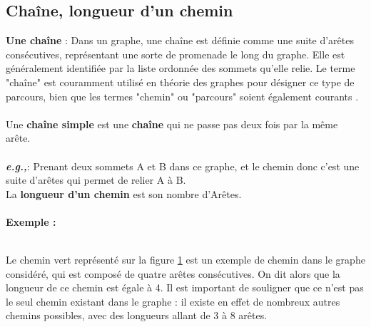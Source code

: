 \documentclass[hidelinks,letterpaper,12pt]{article}
\newcounter{Exemple} %
\begin{document}
\subsection{Chaîne, longueur d’un chemin}
\label{Chaîne, longeur d’un chemin}    
\textbf{Une chaîne} : Dans un graphe, une chaîne est définie comme une suite d'arêtes consécutives, représentant une sorte de promenade le long du graphe. Elle est généralement identifiée par la liste ordonnée des sommets qu'elle relie. Le terme "chaîne" est couramment utilisé en théorie des graphes pour désigner ce type de parcours, bien que les termes "chemin" ou "parcours" soient également courants \citep{mehl}.	
\\ \\
Une \textbf{chaîne simple} est une \textbf{chaîne} qui ne passe pas deux fois par la même arête.
\\ \\
\textbf{\textit{e.g.,}}: Prenant deux sommets A et B dans ce graphe, et le chemin donc c'est une suite d'arêtes qui permet de relier A à B.
\\
La \textbf{longueur d’un chemin} est son nombre d’Arêtes.
\\ \\ 
\textbf{Exemple :}
\begin{figure}[ht]
\centering			
{}
\label{Exemple 1 d'un chemin de longueur 4}	
\end{figure}	
\\
Le chemin vert représenté sur la figure \ref{Exemple 1 d'un chemin de longueur 4} est un exemple de chemin dans le graphe considéré, qui est composé de quatre arêtes consécutives. On dit alors que la longueur de ce chemin est égale à 4. Il est important de souligner que ce n'est pas le seul chemin existant dans le graphe : il existe en effet de nombreux autres chemins possibles, avec des longueurs allant de 3 à 8 arêtes.	
\bigbreak 
\end{document}
